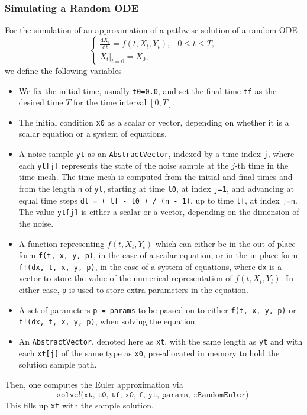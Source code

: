 \documentclass[reqno,12pt]{amsart}
\theoremstyle{plain} %
\theoremstyle{definition} %
\begin{document}
\subsubsection{Simulating a Random ODE}

For the simulation of an approximation of a pathwise solution of a random ODE
\begin{equation}
    \begin{cases}
      \displaystyle \frac{\mathrm{d}X_t}{\mathrm{d} t} = f(t, X_t, Y_t), & 0 \leq t \leq T, \\
      \left. X_t \right|_{t = 0} = X_0,
    \end{cases}
\end{equation}
we define the following variables
\begin{itemize}
    \item We fix the initial time, usually \texttt{t0=0.0}, and set the final time \texttt{tf} as the desired time $T$ for the time interval $[0, T].$
    \item The initial condition \texttt{x0} as a scalar or vector, depending on whether it is a scalar equation or a system of equations.
    \item A noise sample \texttt{yt} as an \texttt{AbstractVector}, indexed by a time index \texttt{j}, where each \texttt{yt[j]} represents the state of the noise sample at the $j$-th time in the time mesh. The time mesh is computed from the initial and final times and from the length \texttt{n} of \texttt{yt}, starting at time \texttt{t0}, at index \texttt{j=1}, and advancing at equal time steps \texttt{dt = ( tf - t0 ) / (n - 1)}, up to time \texttt{tf}, at index \texttt{j=n}. The value \texttt{yt[j]} is either a scalar or a vector, depending on the dimension of the noise.
    \item A function representing $f(t, X_t, Y_t)$ which can either be in the out-of-place form \texttt{f(t, x, y, p)}, in the case of a scalar equation, or in the in-place form \texttt{f!(dx, t, x, y, p)}, in the case of a system of equations, where \texttt{dx} is a vector to store the value of the numerical representation of $f(t, X_t, Y_t).$ In either case, \texttt{p} is used to store extra parameters in the equation.
    \item A set of parameters \texttt{p = params} to be passed on to either \texttt{f(t, x, y, p)} or \texttt{f!(dx, t, x, y, p)}, when solving the equation.
    \item An \texttt{AbstractVector}, denoted here as \texttt{xt}, with the same length as \texttt{yt} and with each \texttt{xt[j]} of the same type as \texttt{x0}, pre-allocated in memory to hold the solution sample path.
\end{itemize}
Then, one computes the Euler approximation via
\[
    \texttt{solve!(xt, t0, tf, x0, f, yt, params, ::RandomEuler)}.
\]
This fills up \texttt{xt} with the sample solution.
\end{document}
